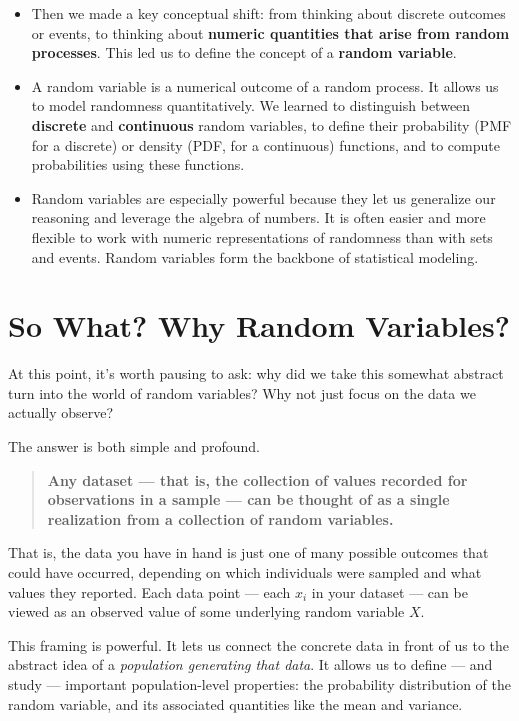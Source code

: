 \documentclass[12pt]{article}
\begin{document}
\begin{itemize}[leftmargin=1.5em]
    \item Then we made a key conceptual shift: from thinking about discrete outcomes or events, to thinking about \textbf{numeric quantities that arise from random processes}. This led us to define the concept of a \textbf{random variable}.

    \item A random variable is a numerical outcome of a random process. It allows us to model randomness quantitatively. We learned to distinguish between \textbf{discrete} and \textbf{continuous} random variables, to define their probability (PMF for a discrete) or density (PDF, for a continuous) functions, and to compute probabilities using these functions.

    \item Random variables are especially powerful because they let us generalize our reasoning and leverage the algebra of numbers. It is often easier and more flexible to work with numeric representations of randomness than with sets and events. Random variables form the backbone of statistical modeling.
\end{itemize}

\section*{So What? Why Random Variables?}

At this point, it’s worth pausing to ask: why did we take this somewhat abstract turn into the world of random variables? Why not just focus on the data we actually observe?

The answer is both simple and profound.

\begin{quote}
    \textbf{Any dataset — that is, the collection of values recorded for observations in a sample — can be thought of as a single realization from a collection of random variables.}
\end{quote}

That is, the data you have in hand is just one of many possible outcomes that could have occurred, depending on which individuals were sampled and what values they reported. Each data point — each $x_i$ in your dataset — can be viewed as an observed value of some underlying random variable $X$.

This framing is powerful. It lets us connect the concrete data in front of us to the abstract idea of a \emph{population generating that data}. It allows us to define — and study — important population-level properties: the probability distribution of the random variable, and its associated quantities like the mean and variance.
\end{document}
